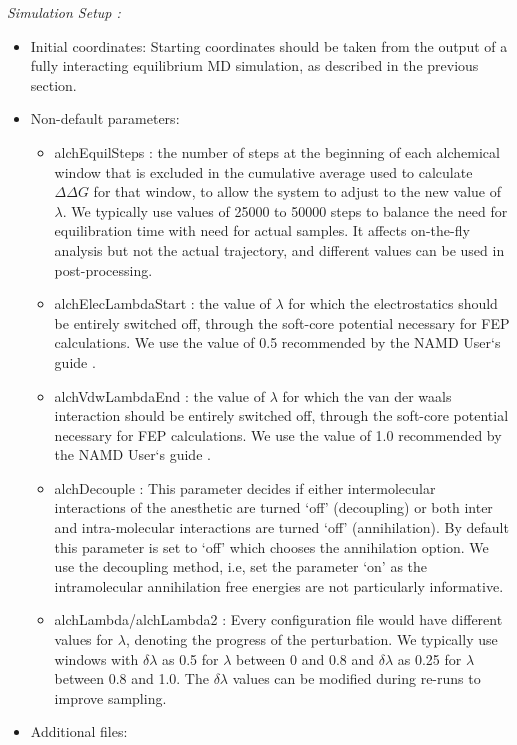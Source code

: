 \documentclass[12pt]{article}
\begin{document}
\textit{Simulation Setup :}
\begin{itemize}
\item Initial coordinates: Starting coordinates should be taken from the output of a fully interacting equilibrium MD simulation, as described in the previous section.  
\item Non-default parameters:
	\begin{itemize} 
	\item alchEquilSteps : the number of steps at the beginning of each alchemical window that is excluded in the cumulative  average used to calculate $\Delta\Delta G$ for that window, to allow the system to adjust to the new value of $\lambda$. We typically use values of 25000 to 50000 steps to balance the need for equilibration time with need for actual samples.  It affects on-the-fly analysis but not the actual trajectory, and different values can be used in post-processing. 
	\item alchElecLambdaStart : the value of $\lambda$ for which the electrostatics should be entirely switched off, through the soft-core potential necessary for FEP calculations.   We use the value of 0.5 recommended by the NAMD User`s guide \cite{Git---2017}.
	\item alchVdwLambdaEnd : the value of $\lambda$ for which the van der waals interaction should be entirely switched off, through the soft-core potential necessary for FEP calculations.   We use the value of 1.0 recommended by the NAMD User`s guide \cite{Git---2017}.
	\item alchDecouple : This parameter decides if either intermolecular interactions of the anesthetic are turned `off' (decoupling) or both inter and intra-molecular interactions are turned `off' (annihilation). By default this parameter is set to `off' which chooses the annihilation option. We use the decoupling method, i.e, set the parameter `on' as the intramolecular annihilation free energies are not particularly informative.
	\item alchLambda/alchLambda2 : Every configuration file would have different values for $\lambda$, denoting the progress of the perturbation. We typically use windows with $\delta$$\lambda$ as 0.5 for $\lambda$ between 0 and 0.8 and  $\delta$$\lambda$ as 0.25 for $\lambda$ between 0.8 and 1.0. The  $\delta$$\lambda$ values can be modified during re-runs to improve sampling.
	\end{itemize}
\item Additional files:
	\begin{itemize} 

\end{itemize}
\end{itemize}
\end{document}
